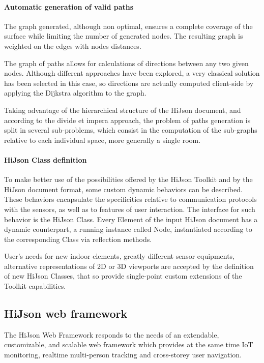 \documentclass{sig-alternate}
\begin{document}
\paragraph{Automatic generation of valid paths}

The graph generated, although non optimal, ensures a complete coverage of the surface while limiting the number of generated nodes. The resulting graph is weighted on the edges with nodes distances. 

The graph of paths allows for calculations of directions between any two given nodes. Although different approaches have been explored, a very classical solution has been selected in this case, so directions are actually computed client-side by applying the Dijkstra algorithm to the graph.

Taking advantage of the hierarchical structure of the HiJson document, and according to the divide et impera approach, the problem of paths generation is split in several sub-problems, which consist in the computation of the sub-graphs relative to each individual space, more generally a single room. 

\paragraph{HiJson Class definition}

To make better use of the possibilities offered by the HiJson Toolkit and by the HiJson document format, some custom dynamic behaviors can be described. These behaviors encapsulate the specificities relative to communication protocols with the sensors, as well as to features of user interaction. The interface for such behavior is the HiJson Class.
Every Element of the input HiJson document has a dynamic counterpart, a running instance called  Node, instantiated according to the corresponding Class via reflection methods.


User's needs for new indoor elements, greatly different sensor equipments, alternative representations of 2D or 3D viewports are accepted by the definition of new HiJson Classes, that so provide single-point custom extensions of the Toolkit capabilities.

\subsection{HiJson web framework}

The HiJson Web Framework responds to the needs of an extendable, customizable, and scalable web framework which provides at the same time IoT monitoring, realtime multi-person tracking and cross-storey user navigation.
\end{document}
